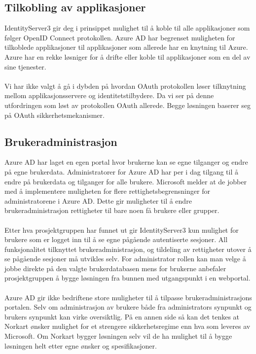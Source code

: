\subsection*{Tilkobling av applikasjoner}
IdentityServer3 gir deg i prinsippet mulighet til å koble til alle applikasjoner som følger OpenID Connect protokollen. Azure AD har begrenset muligheten for tilkoblede applikasjoner til applikasjoner som allerede har en knytning til Azure. Azure har en rekke løsniger for å drifte eller koble til applikasjoner som en del av sine tjenester. 
\\
\\
Vi har ikke valgt å gå i dybden på hvordan OAuth protokollen løser tilknytning mellom applikasjonsservere og identitetstilbydere. Da vi ser på denne utfordringen som løst av protokollen OAuth allerede. Begge løsningen baserer seg på OAuth sikkerhetsmekanismer. 

\subsection*{Brukeradministrasjon}
Azure AD har laget en egen portal hvor brukerne kan se egne tilganger og endre på egne brukerdata. Administratorer for Azure AD har per i dag tilgang til å endre på brukerdata og tilganger for alle brukere. Microsoft melder at de jobber med å implementere muligheten for flere rettighetsbegrensninger for administratorene i Azure AD. Dette gir muligheter til å endre brukeradministrasjon rettigheter til bare noen få brukere eller grupper.
\\
\\
Etter hva prosjektgruppen har funnet ut gir IdentityServer3 kun mulighet for brukere som er logget inn til å se egne pågående autentiserte sesjoner. All funksjonalitet tilknyttet brukeradministrasjon, og tildeling av rettigheter utover å se pågående sesjoner må utvikles selv. For administrator rollen kan man velge å jobbe direkte på den valgte brukerdatabasen mens for brukerne anbefaler prosjektgruppen å bygge løsningen fra bunnen med utgangspunkt i en webportal.
\\
\\
Azure AD gir ikke bedriftene store muligheter til å tilpasse brukeradministrasjons portalen. Selv om administrasjon av brukere både fra administrators synpunkt og brukers synpunkt kan virke oversiktlig. På en annen side så kan det tenkes at Norkart ønsker mulighet for et strengere sikkerhetsregime enn hva som leveres av Microsoft. Om Norkart bygger løsningen selv vil de ha mulighet til å bygge løsningen helt etter egne ønsker og spesifikasjoner. 

